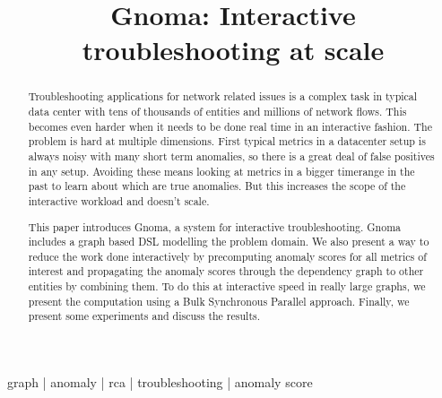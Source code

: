 \documentclass[times, twoside, watermark]{zHenriquesLab-StyleBioRxiv}
\begin{document}
\title{Gnoma: Interactive troubleshooting at scale}



\maketitle

\begin{abstract}
Troubleshooting applications for network related issues is a complex task in typical data center with tens of thousands of entities and millions of network flows. This becomes even harder when it needs to be done real time in an interactive fashion. The problem is hard at multiple dimensions. First typical metrics in a datacenter setup is always noisy with many short term anomalies, so there is a great deal of false positives in any setup. Avoiding these means looking at metrics in a bigger timerange in the past to learn about which are true anomalies. But this increases the scope of the interactive workload and doesn't scale.

This paper introduces Gnoma, a system for interactive troubleshooting. Gnoma includes a graph based DSL modelling the problem domain. We also present a way to reduce the work done interactively by precomputing anomaly scores for all metrics of interest and propagating the anomaly scores through the dependency graph to other entities by combining them. To do this at interactive speed in really large graphs, we present the computation using a Bulk Synchronous Parallel approach. Finally, we present some experiments and discuss the results.

\end {abstract}

\begin{keywords}
graph | anomaly | rca | troubleshooting | anomaly score
\end{keywords}

\end{document}
